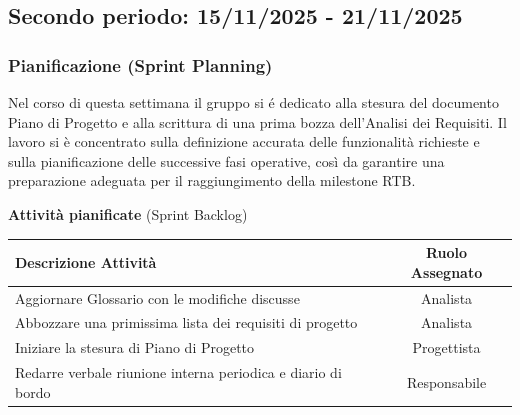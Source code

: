 \documentclass[a4paper, 11pt, oneside]{scrartcl} %
\begin{document}
\subsection{Secondo periodo: 15/11/2025 - 21/11/2025}

\subsubsection*{Pianificazione (Sprint Planning)}

Nel corso di questa settimana il gruppo si é dedicato alla stesura del documento Piano di Progetto e alla scrittura di una prima bozza dell’Analisi dei Requisiti. Il lavoro si è concentrato sulla definizione accurata delle funzionalità richieste e sulla pianificazione delle successive fasi operative, così da garantire una preparazione adeguata per il raggiungimento della milestone RTB.

\begin{table}[!ht]
\vspace{0.2cm}
\centering
{\large \textbf{Attività pianificate} (Sprint Backlog)} \\
\vspace{0.3cm}
\renewcommand{\arraystretch}{1.4}
\begin{tabularx}{\textwidth}{|X|c|} 
\hline
\rowcolor{white} 
\textbf{Descrizione Attività} & \textbf{Ruolo Assegnato} \\
\hline
Aggiornare Glossario con le modifiche discusse & Analista \\
Abbozzare una primissima lista dei requisiti di progetto & Analista \\
Iniziare la stesura di Piano di Progetto & Progettista \\
Redarre verbale riunione interna periodica e diario di bordo & Responsabile \\
\hline
\end{tabularx}
\end{table}
\FloatBarrier
\end{document}
